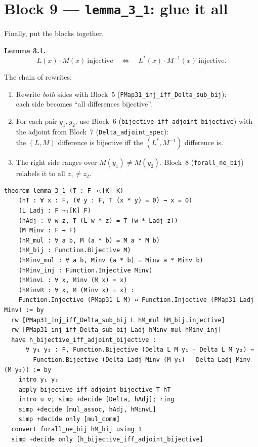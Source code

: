 \documentclass[11pt]{article}
\begin{document}
\section{Block 9 --- \texttt{lemma\_3\_1}: glue it all}

Finally, put the blocks together.

\textbf{Lemma 3.1.}
\[
  L(x)\cdot M(x)\ \text{injective}
  \quad\Longleftrightarrow\quad
  L^{*}(x)\cdot M^{-1}(x)\ \text{injective}.
\]

The chain of rewrites:

\begin{enumerate}
  \item Rewrite \emph{both} sides with Block~5
        (\texttt{PMap31\_inj\_iff\_Delta\_sub\_bij}):\\
        each side becomes ``all differences bijective''.
  \item For each pair $y_1,y_2$, use Block~6
        (\texttt{bijective\_iff\_adjoint\_bijective}) with the adjoint
        from Block~7 (\texttt{Delta\_adjoint\_spec}):\\
        the $(L,M)$ difference is bijective iff the
        $(L^{*},M^{-1})$ difference is.
  \item The right side ranges over $M(y_1)\neq M(y_2)$.
        Block~8 (\texttt{forall\_ne\_bij}) relabels it to all $z_1\neq z_2$.
\end{enumerate}

\begin{center}
\end{center}

\begin{lstlisting}
theorem lemma_3_1 (T : F →ₗ[K] K)
    (hT : ∀ x : F, (∀ y : F, T (x * y) = 0) → x = 0)
    (L Ladj : F →ₗ[K] F)
    (hAdj : ∀ w z, T (L w * z) = T (w * Ladj z))
    (M Minv : F → F)
    (hM_mul : ∀ a b, M (a * b) = M a * M b)
    (hM_bij : Function.Bijective M)
    (hMinv_mul : ∀ a b, Minv (a * b) = Minv a * Minv b)
    (hMinv_inj : Function.Injective Minv)
    (hMinvL : ∀ x, Minv (M x) = x)
    (hMinvR : ∀ x, M (Minv x) = x) :
    Function.Injective (PMap31 L M) ↔ Function.Injective (PMap31 Ladj Minv) := by
  rw [PMap31_inj_iff_Delta_sub_bij L hM_mul hM_bij.injective]
  rw [PMap31_inj_iff_Delta_sub_bij Ladj hMinv_mul hMinv_inj]
  have h_bijective_iff_adjoint_bijective :
      ∀ y₁ y₂ : F, Function.Bijective (Delta L M y₁ - Delta L M y₂) ↔
        Function.Bijective (Delta Ladj Minv (M y₁) - Delta Ladj Minv (M y₂)) := by
    intro y₁ y₂
    apply bijective_iff_adjoint_bijective T hT
    intro u v; simp +decide [Delta, hAdj]; ring
    simp +decide [mul_assoc, hAdj, hMinvL]
    simp +decide only [mul_comm]
  convert forall_ne_bij hM_bij using 1
  simp +decide only [h_bijective_iff_adjoint_bijective]
\end{lstlisting}
\end{document}
